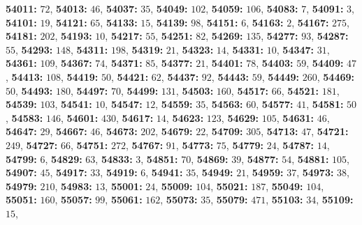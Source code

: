\textsf{\bfseries 54011:} $72$, \textsf{\bfseries 54013:} $46$, \textsf{\bfseries 54037:} $35$, \textsf{\bfseries 54049:} $102$, \textsf{\bfseries 54059:} $106$, \textsf{\bfseries 54083:} $7$, \textsf{\bfseries 54091:} $3$, \textsf{\bfseries 54101:} $19$, \textsf{\bfseries 54121:} $65$, \textsf{\bfseries 54133:} $15$, \textsf{\bfseries 54139:} $98$, \textsf{\bfseries 54151:} $6$, \textsf{\bfseries 54163:} $2$, \textsf{\bfseries 54167:} $275$, \textsf{\bfseries 54181:} $202$, \textsf{\bfseries 54193:} $10$, \textsf{\bfseries 54217:} $55$, \textsf{\bfseries 54251:} $82$, \textsf{\bfseries 54269:} $135$, \textsf{\bfseries 54277:} $93$, \textsf{\bfseries 54287:} $55$, \textsf{\bfseries 54293:} $148$, \textsf{\bfseries 54311:} $198$, \textsf{\bfseries 54319:} $21$, \textsf{\bfseries 54323:} $14$, \textsf{\bfseries 54331:} $10$, \textsf{\bfseries 54347:} $31$, \textsf{\bfseries 54361:} $109$, \textsf{\bfseries 54367:} $74$, \textsf{\bfseries 54371:} $85$, \textsf{\bfseries 54377:} $21$, \textsf{\bfseries 54401:} $78$, \textsf{\bfseries 54403:} $59$, \textsf{\bfseries 54409:} $47$, \textsf{\bfseries 54413:} $108$, \textsf{\bfseries 54419:} $50$, \textsf{\bfseries 54421:} $62$, \textsf{\bfseries 54437:} $92$, \textsf{\bfseries 54443:} $59$, \textsf{\bfseries 54449:} $260$, \textsf{\bfseries 54469:} $50$, \textsf{\bfseries 54493:} $180$, \textsf{\bfseries 54497:} $70$, \textsf{\bfseries 54499:} $131$, \textsf{\bfseries 54503:} $160$, \textsf{\bfseries 54517:} $66$, \textsf{\bfseries 54521:} $181$, \textsf{\bfseries 54539:} $103$, \textsf{\bfseries 54541:} $10$, \textsf{\bfseries 54547:} $12$, \textsf{\bfseries 54559:} $35$, \textsf{\bfseries 54563:} $60$, \textsf{\bfseries 54577:} $41$, \textsf{\bfseries 54581:} $50$, \textsf{\bfseries 54583:} $146$, \textsf{\bfseries 54601:} $430$, \textsf{\bfseries 54617:} $14$, \textsf{\bfseries 54623:} $123$, \textsf{\bfseries 54629:} $105$, \textsf{\bfseries 54631:} $46$, \textsf{\bfseries 54647:} $29$, \textsf{\bfseries 54667:} $46$, \textsf{\bfseries 54673:} $202$, \textsf{\bfseries 54679:} $22$, \textsf{\bfseries 54709:} $305$, \textsf{\bfseries 54713:} $47$, \textsf{\bfseries 54721:} $249$, \textsf{\bfseries 54727:} $66$, \textsf{\bfseries 54751:} $272$, \textsf{\bfseries 54767:} $91$, \textsf{\bfseries 54773:} $75$, \textsf{\bfseries 54779:} $24$, \textsf{\bfseries 54787:} $14$, \textsf{\bfseries 54799:} $6$, \textsf{\bfseries 54829:} $63$, \textsf{\bfseries 54833:} $3$, \textsf{\bfseries 54851:} $70$, \textsf{\bfseries 54869:} $39$, \textsf{\bfseries 54877:} $54$, \textsf{\bfseries 54881:} $105$, \textsf{\bfseries 54907:} $45$, \textsf{\bfseries 54917:} $33$, \textsf{\bfseries 54919:} $6$, \textsf{\bfseries 54941:} $35$, \textsf{\bfseries 54949:} $21$, \textsf{\bfseries 54959:} $37$, \textsf{\bfseries 54973:} $38$, \textsf{\bfseries 54979:} $210$, \textsf{\bfseries 54983:} $13$, \textsf{\bfseries 55001:} $24$, \textsf{\bfseries 55009:} $104$, \textsf{\bfseries 55021:} $187$, \textsf{\bfseries 55049:} $104$, \textsf{\bfseries 55051:} $160$, \textsf{\bfseries 55057:} $99$, \textsf{\bfseries 55061:} $162$, \textsf{\bfseries 55073:} $35$, \textsf{\bfseries 55079:} $471$, \textsf{\bfseries 55103:} $34$, \textsf{\bfseries 55109:} $15$, 
